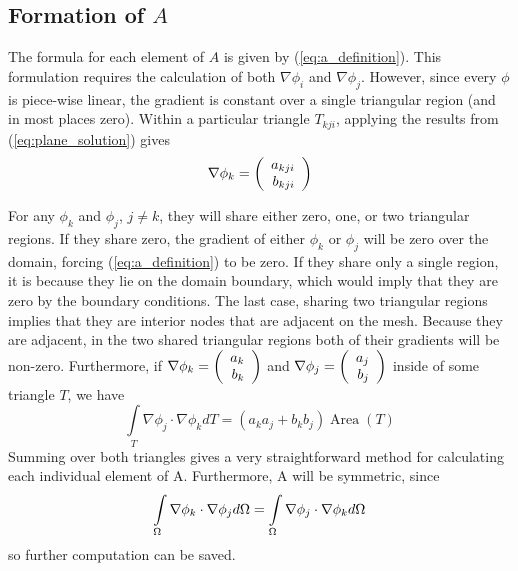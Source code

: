 \subsection{Formation of $A$}
The formula for each element of $A$ is given by (\ref{eq:a_definition}). This formulation requires the calculation
of both $\nabla \phi_i$ and $\nabla \phi_j$. However, since every $\phi$ is piece-wise linear, the gradient
is constant over a single triangular region (and in most places zero). Within a particular triangle $T_{kji}$, applying the results from
(\ref{eq:plane_solution}) gives
\begin{equation} \label{eq:grad_phi_definition}
\nabla \phi_k = \left(\begin{array}{rrrrrr} a_{kji} \\ b_{kji} \\ \end{array} \right)
\end{equation}

For any $\phi_k$ and $\phi_j$, $j \ne k$, they will share either zero, one, or two triangular regions. If they share
zero, the gradient of either $\phi_k$ or $\phi_j$ will be zero over the domain, forcing (\ref{eq:a_definition}) to
be zero. If they share only a single region, it is because they lie on the domain boundary, which would imply that
they are zero by the boundary conditions. The last case, sharing two triangular regions implies that they are interior
nodes that are adjacent on the mesh. Because they are adjacent, in the two shared triangular regions both of their
gradients will be non-zero. Furthermore, if $\nabla \phi_k = \left(\begin{array}{rrrrrr} a_k \\ b_k \\ \end{array} \right)$ and $\nabla \phi_j = \left(\begin{array}{rrrrrr} a_j \\ b_j \\ \end{array} \right)$
inside of some triangle $T$, we have
\begin{equation}
\int\limits_T \nabla \phi_j \cdot \nabla \phi_k dT
=
\left( a_k a_j + b_k b_j \right) \mathop{Area}(T)
\end{equation}
Summing over both triangles gives a very straightforward method for calculating each individual element of A. Furthermore,
A will be symmetric, since
\begin{equation}
\int\limits_{\Omega} \nabla \phi_k \cdot \nabla \phi_j d\Omega = \int\limits_{\Omega} \nabla \phi_j \cdot \nabla \phi_k d\Omega
\end{equation}
so further computation can be saved.
